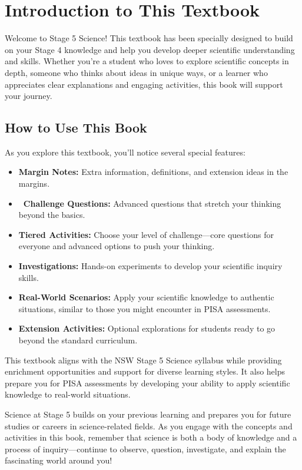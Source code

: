 \chapter*{Introduction to This Textbook}

Welcome to Stage 5 Science! This textbook has been specially designed to build on your Stage 4 knowledge and help you develop deeper scientific understanding and skills. Whether you're a student who loves to explore scientific concepts in depth, someone who thinks about ideas in unique ways, or a learner who appreciates clear explanations and engaging activities, this book will support your journey.

\section*{How to Use This Book}

As you explore this textbook, you'll notice several special features:

\begin{itemize}
    \item \textbf{Margin Notes:} Extra information, definitions, and extension ideas in the margins.
    \item \textbf{\challengeicon\ Challenge Questions:} Advanced questions that stretch your thinking beyond the basics.
    \item \textbf{Tiered Activities:} Choose your level of challenge—core questions for everyone and advanced options to push your thinking.
    \item \textbf{Investigations:} Hands-on experiments to develop your scientific inquiry skills.
    \item \textbf{Real-World Scenarios:} Apply your scientific knowledge to authentic situations, similar to those you might encounter in PISA assessments.
    \item \textbf{Extension Activities:} Optional explorations for students ready to go beyond the standard curriculum.
\end{itemize}

This textbook aligns with the NSW Stage 5 Science syllabus while providing enrichment opportunities and support for diverse learning styles. It also helps prepare you for PISA assessments by developing your ability to apply scientific knowledge to real-world situations.

Science at Stage 5 builds on your previous learning and prepares you for future studies or careers in science-related fields. As you engage with the concepts and activities in this book, remember that science is both a body of knowledge and a process of inquiry—continue to observe, question, investigate, and explain the fascinating world around you!